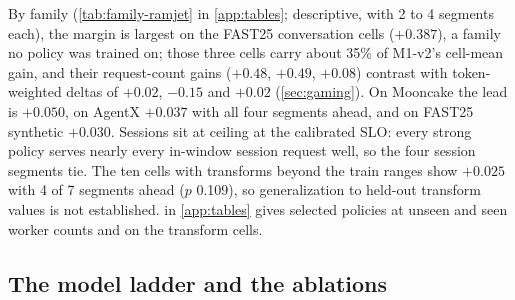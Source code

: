 By family (\cref{tab:family-ramjet} in \cref{app:tables}; descriptive, with 2 to 4 segments each),
the margin is largest on the FAST25 conversation cells ($+0.387$), a family no policy was trained on; those three cells carry about 35\% of M1-v2's
cell-mean gain, and their request-count gains ($+0.48$, $+0.49$, $+0.08$) contrast with token-weighted
deltas of $+0.02$, $-0.15$ and $+0.02$ (\cref{sec:gaming}). On Mooncake the lead is $+0.050$, on
AgentX $+0.037$ with all four segments ahead, and on FAST25 synthetic $+0.030$. Sessions sit at
ceiling at the calibrated SLO: every strong policy serves nearly every in-window session request
well, so the four session segments tie. The ten cells with transforms beyond the train ranges show
$+0.025$ with 4 of 7 segments ahead ($p$ 0.109), so generalization to held-out transform values is
not established.  in \cref{app:tables} gives selected policies at unseen and seen
worker counts and on the transform cells.

\subsection{The model ladder and the ablations}
\label{sec:res-ladder}

\begin{table}[tbp]
  \centering
  \caption{The model ladder. Val $k_{0..2}$ and Val $k_{3..10}$: mean clipped log-ratio against
    $\piref$ on the selection replicates and on the fresh validation replicates. Test against $\piref$
    is a mean over cells; test against tuned  is a segment mean with its 95\% interval
    and one-sided $p$.  in \cref{app:tables} gives the restart and generation at
    which each configuration was selected.}
  \label{tab:ladder-results}
  
\end{table}

